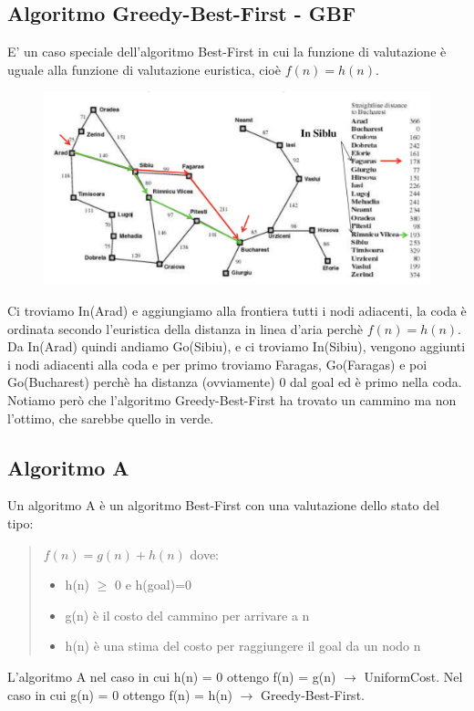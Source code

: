 \documentclass{article}
\begin{document}
\subsection{Algoritmo Greedy-Best-First - GBF}
E' un caso speciale dell'algoritmo Best-First in cui la funzione di valutazione è uguale alla funzione di valutazione euristica, cioè $f(n)=h(n)$.
\begin{figure}[H]
    \centering
    \includegraphics[scale=0.6]{Images/GBF.png}
\end{figure}
Ci troviamo In(Arad) e aggiungiamo alla frontiera tutti i nodi adiacenti, la coda è ordinata secondo l'euristica della distanza in linea d'aria perchè $f(n)=h(n)$. Da In(Arad) quindi andiamo Go(Sibiu), e ci troviamo In(Sibiu), vengono aggiunti i nodi adiacenti alla coda e per primo troviamo Faragas, Go(Faragas) e poi Go(Bucharest) perchè ha distanza (ovviamente) 0 dal goal ed è primo nella coda. Notiamo però che l'algoritmo Greedy-Best-First ha trovato un cammino ma non l'ottimo, che sarebbe quello in verde.

\subsection{Algoritmo A}
Un algoritmo A è un algoritmo Best-First con una valutazione dello stato del tipo:
\begin{quote}
    $f(n) = g(n) + h(n) $ dove:
    \begin{itemize}
        \item h(n) $\geq$ 0 e h(goal)=0
        \item g(n) è il costo del cammino per arrivare a n
        \item h(n) è una stima del costo per raggiungere il goal da un nodo n
    \end{itemize}
\end{quote}
L'algoritmo A nel caso in cui h(n) = 0 ottengo f(n) = g(n) $\rightarrow$ UniformCost. \newline
Nel caso in cui g(n) = 0 ottengo f(n) = h(n) $\rightarrow$ Greedy-Best-First.
\end{document}
